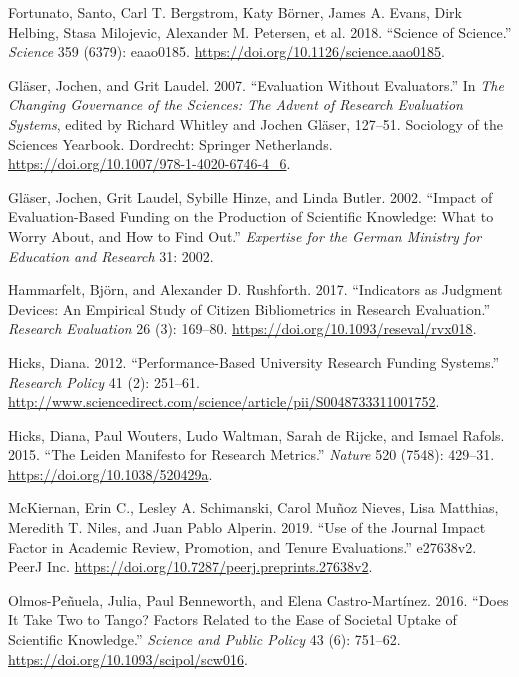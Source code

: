 \documentclass[]{elsarticle} %
\begin{document}
\leavevmode\hypertarget{ref-fortunatoScienceScience2018}{}%
Fortunato, Santo, Carl T. Bergstrom, Katy Börner, James A. Evans, Dirk
Helbing, Stasa Milojevic, Alexander M. Petersen, et al. 2018. ``Science
of Science.'' \emph{Science} 359 (6379): eaao0185.
\url{https://doi.org/10.1126/science.aao0185}.

\leavevmode\hypertarget{ref-glaserEvaluationEvaluators2007}{}%
Gläser, Jochen, and Grit Laudel. 2007. ``Evaluation Without
Evaluators.'' In \emph{The Changing Governance of the Sciences: The
Advent of Research Evaluation Systems}, edited by Richard Whitley and
Jochen Gläser, 127--51. Sociology of the Sciences Yearbook. Dordrecht:
Springer Netherlands. \url{https://doi.org/10.1007/978-1-4020-6746-4_6}.

\leavevmode\hypertarget{ref-glaserImpactEvaluationbasedFunding2002}{}%
Gläser, Jochen, Grit Laudel, Sybille Hinze, and Linda Butler. 2002.
``Impact of Evaluation-Based Funding on the Production of Scientific
Knowledge: What to Worry About, and How to Find Out.'' \emph{Expertise
for the German Ministry for Education and Research} 31: 2002.

\leavevmode\hypertarget{ref-hammarfeltIndicatorsJudgmentDevices2017}{}%
Hammarfelt, Björn, and Alexander D. Rushforth. 2017. ``Indicators as
Judgment Devices: An Empirical Study of Citizen Bibliometrics in
Research Evaluation.'' \emph{Research Evaluation} 26 (3): 169--80.
\url{https://doi.org/10.1093/reseval/rvx018}.

\leavevmode\hypertarget{ref-hicksPerformancebasedUniversityResearch2012}{}%
Hicks, Diana. 2012. ``Performance-Based University Research Funding
Systems.'' \emph{Research Policy} 41 (2): 251--61.
\url{http://www.sciencedirect.com/science/article/pii/S0048733311001752}.

\leavevmode\hypertarget{ref-hicksLeidenManifestoResearch2015}{}%
Hicks, Diana, Paul Wouters, Ludo Waltman, Sarah de Rijcke, and Ismael
Rafols. 2015. ``The Leiden Manifesto for Research Metrics.''
\emph{Nature} 520 (7548): 429--31.
\url{https://doi.org/10.1038/520429a}.

\leavevmode\hypertarget{ref-mckiernanUseJournalImpact2019}{}%
McKiernan, Erin C., Lesley A. Schimanski, Carol Muñoz Nieves, Lisa
Matthias, Meredith T. Niles, and Juan Pablo Alperin. 2019. ``Use of the
Journal Impact Factor in Academic Review, Promotion, and Tenure
Evaluations.'' e27638v2. PeerJ Inc.
\url{https://doi.org/10.7287/peerj.preprints.27638v2}.

\leavevmode\hypertarget{ref-olmos-penuelaDoesItTake2016}{}%
Olmos-Peñuela, Julia, Paul Benneworth, and Elena Castro-Martínez. 2016.
``Does It Take Two to Tango? Factors Related to the Ease of Societal
Uptake of Scientific Knowledge.'' \emph{Science and Public Policy} 43
(6): 751--62. \url{https://doi.org/10.1093/scipol/scw016}.
\end{document}
